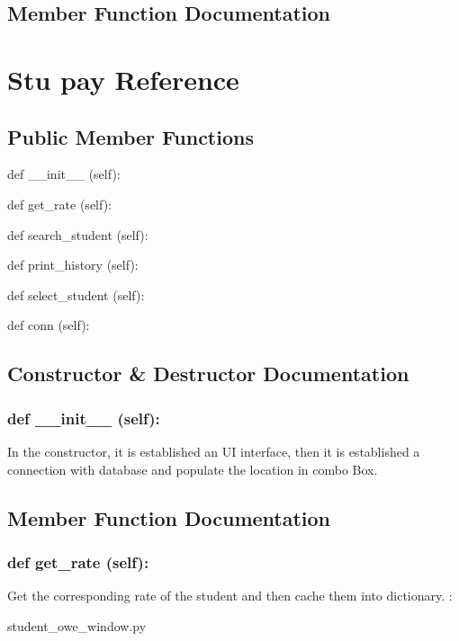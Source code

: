 \subsection{Member Function Documentation}

\hypertarget{Stu_pay}{\section{Stu pay Reference}
\label{Stu_pay}
}
\subsection*{Public Member Functions}
\begin{DoxyCompactItemize}
\item 
def {\_\_init\_\_} (self):
\item 
def {get\_rate} (self):
\item 
def {search\_student} (self):
\item 
def {print\_history} (self):
\item 
def {select\_student} (self):
\item 
def {conn} (self):

\end{DoxyCompactItemize}

\subsection{Constructor \& Destructor Documentation}
\hypertarget{class_poly_aa3def076b74bed67904976ad4f9fe9b1}{
\subsubsection[{def __init__ (self):}]{\setlength{\rightskip}{0pt plus 5cm}def {\_\_init\_\_} (self): 
}}
In the constructor, it is established an UI interface, then it is  established a connection with database and populate the location in combo Box.
 

\subsection{Member Function Documentation}
\hypertarget{class_poly_a14a7ad77ce612b0c54f531d307ee4b39}{
\subsubsection[{def get_rate (self):}]{\setlength{\rightskip}{0pt plus 5cm}def {get\_rate} (self):}}\label{class_poly_a14a7ad77ce612b0c54f531d307ee4b39}
Get the corresponding rate of the student and then cache them into dictionary.
:\begin{DoxyCompactItemize}
\item 
student\_owe\_window.\-py\end{DoxyCompactItemize}

